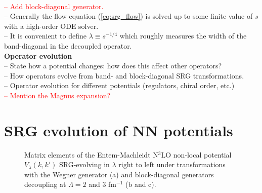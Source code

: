 \documentclass[preprintnumbers,floatfix,aps,prc,preprint,nofootinbib]{revtex4-1}
\begin{document}
\\
\textcolor{red}{%
-- Add block-diagonal generator.
}
\\
-- Generally the flow equation (\ref{eq:srg_flow}) is solved up to some finite value of $s$ with a high-order ODE solver.
\\
-- It is convenient to define $\lambda \equiv s^{-1/4}$ which roughly measures the width of the band-diagonal in the decoupled operator.
\\
\textbf{Operator evolution}
\\
-- State how a potential changes: how does this affect other operators?
\\
-- How operators evolve from band- and block-diagonal SRG transformations.
\\
-- Operator evolution for different potentials (regulators, chiral order, etc.)
\\
\textcolor{red}{%
-- Mention the Magnus expansion?
}


\section{SRG evolution of NN potentials}
\label{sec:srg_evolution_nn_potentials}


%
\begin{figure}[H]
	\centering
	

	\caption{Matrix elements of the Entem-Machleidt N$^3$LO non-local potential $V_{\lambda}(k, k')$ SRG-evolving in $\lambda$ right to left under transformations with the Wegner generator (a) and block-diagonal generators decoupling at $\Lambda=2$ and $3$ fm$^{-1}$ (b and c).}
	\label{potential_contours_kvnn10_3S1}
\end{figure}
\end{document}
